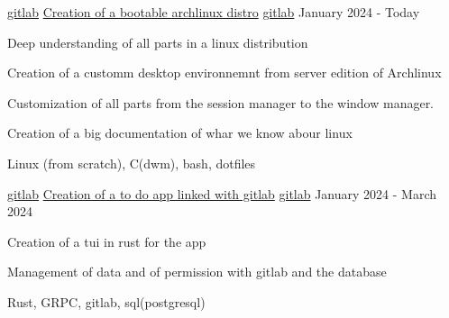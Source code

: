 

\begin{cventries}

	\cventry
	{\href{https://gitlab.com/letmerice/}{gitlab}} %
	{\href{https://gitlab.com/letmerice/oh-my-arch}{Creation of a bootable archlinux distro}}
	{\href{https://gitlab.com/letmerice/oh-my-arch}{gitlab}} %
	{January 2024 - Today} %
	{
		\begin{cvitems} %
			\item {Deep  understanding of all parts in a linux distribution}
			\item {Creation of a customm desktop environnemnt from server edition of Archlinux}
			\item {Customization of all parts from the session manager to the window manager.}
			\item {Creation of a big documentation of whar we know abour linux}
		\end{cvitems}
	}
	{
		\begin{cvitemsskills} %
			\item {Linux (from scratch), C(dwm), bash, dotfiles}
		\end{cvitemsskills}
	}


	\cventry
	{\href{https://gitlab.com/letmerice/}{gitlab}} %
	{\href{https://gitlab.com/letmerice/anything}{Creation  of a to do app linked with gitlab}} %
	{\href{https://gitlab.com/letmerice/anything}{gitlab}} %
	{January 2024 - March 2024} %
	{
		\begin{cvitems} %
			\item {Creation of a tui in rust for the app}
			\item {Management of data and of permission with gitlab and the database}
		\end{cvitems}
	}
	{
		\begin{cvitemsskills} %
			\item {Rust, GRPC, gitlab, sql(postgresql)}
		\end{cvitemsskills}
	}


\end{cventries}
